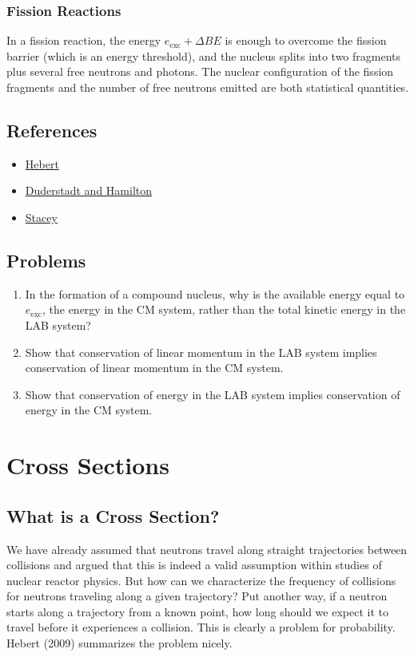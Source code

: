 \documentclass[11pt]{article}
\begin{document}
\subsubsection{Fission Reactions}
\label{sec:orgheadline8}
In a fission reaction, the energy \(e_{\text{exc}} + \Delta BE\) is enough to overcome the fission barrier (which is an energy threshold), and the nucleus splits into two fragments plus several free neutrons and photons.  The nuclear configuration of the fission fragments and the number of free neutrons emitted are both statistical quantities.  
\subsection{References}
\label{sec:orgheadline10}
\begin{itemize}
\item \href{Hebert2009}{Hebert}
\item \href{Duderstadt:Hamilton1976}{Duderstadt and Hamilton}
\item \href{Stacey2001}{Stacey}
\end{itemize}
\subsection{Problems}
\label{sec:orgheadline11}
\begin{enumerate}
\item In the formation of a compound nucleus, why is the available energy equal to \(e_\text{exc}\), the energy in the CM system, rather than the total kinetic energy in the LAB system?
\item Show that conservation of linear momentum in the LAB system implies conservation of linear momentum in the CM system.
\item Show that conservation of energy in the LAB system implies conservation of energy in the CM system.
\end{enumerate}

\section{Cross Sections}
\label{sec:orgheadline25}
\subsection{What is a Cross Section?}
\label{sec:orgheadline13}
We have already assumed that neutrons travel along straight trajectories between collisions and argued that this is indeed a valid assumption within studies of nuclear reactor physics.  But how can we characterize the frequency of collisions for neutrons traveling along a given trajectory?  Put another way, if a neutron starts along a trajectory from a known point, how long should we expect it to travel before it experiences a collision.  This is clearly a problem for probability.  Hebert (2009) summarizes the problem nicely.
\end{document}

